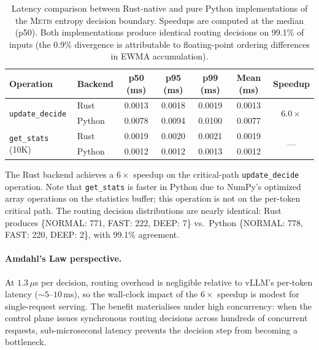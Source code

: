 \documentclass[11pt,a4paper]{article}
\newcommand{\metis}{\textsc{Metis}}
\begin{document}
\begin{table}[ht]
\centering
\caption{Latency comparison between Rust-native and pure Python implementations of the \metis{} entropy decision boundary. Speedups are computed at the median (p50). Both implementations produce identical routing decisions on 99.1\% of inputs (the 0.9\% divergence is attributable to floating-point ordering differences in EWMA accumulation).}
\label{tab:latency}
\begin{tabular}{@{}llccccc@{}}
\toprule
\textbf{Operation} & \textbf{Backend} & \textbf{p50 (ms)} & \textbf{p95 (ms)} & \textbf{p99 (ms)} & \textbf{Mean (ms)} & \textbf{Speedup} \\
\midrule
\multirow{2}{*}{\texttt{update\_decide}} & Rust   & 0.0013 & 0.0018 & 0.0019 & 0.0013 & \multirow{2}{*}{$\mathbf{6.0\times}$} \\
                                          & Python & 0.0078 & 0.0094 & 0.0100 & 0.0077 & \\
\midrule
\multirow{2}{*}{\texttt{get\_stats} (10K)} & Rust   & 0.0019 & 0.0020 & 0.0021 & 0.0019 & \multirow{2}{*}{---} \\
                                            & Python & 0.0012 & 0.0012 & 0.0013 & 0.0012 & \\
\bottomrule
\end{tabular}
\end{table}

The Rust backend achieves a $6\times$ speedup on the critical-path \texttt{update\_decide} operation. Note that \texttt{get\_stats} is faster in Python due to NumPy's optimized array operations on the statistics buffer; this operation is not on the per-token critical path. The routing decision distributions are nearly identical: Rust produces \{NORMAL: 771, FAST: 222, DEEP: 7\} vs.\ Python \{NORMAL: 778, FAST: 220, DEEP: 2\}, with 99.1\% agreement.

\paragraph{Amdahl's Law perspective.} At $1.3\,\mu$s per decision, routing overhead is negligible relative to vLLM's per-token latency ($\sim$$5$--$10$\,ms), so the wall-clock impact of the $6\times$ speedup is modest for single-request serving. The benefit materialises under high concurrency: when the control plane issues synchronous routing decisions across hundreds of concurrent requests, sub-microsecond latency prevents the decision step from becoming a bottleneck.
\end{document}
